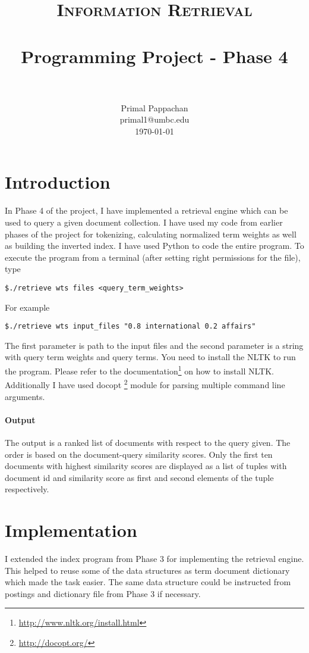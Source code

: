 \documentclass[paper=a4, fontsize=11pt]{scrartcl}
\title{
		\usefont{OT1}{bch}{b}{n}
		\normalfont \normalsize \textsc{Information Retrieval} \\ [25pt]
		\horrule{0.5pt} \\[0.4cm]
		\huge Programming Project - Phase 4 \\
		\horrule{2pt} \\[0.5cm]
}
\author{
		\normalfont 								\normalsize
        Primal Pappachan\\[-3pt]		\normalsize
        primal1@umbc.edu\\[-3pt]		\normalsize
        \today
}
\date{}
\numberwithin{equation}{section}		%
\numberwithin{figure}{section}			%
\numberwithin{table}{section}				%
\begin{document}
\maketitle
\section{Introduction}
In Phase 4 of the project, I have implemented a retrieval engine which can be used to query a given document collection. I have used my code from earlier phases of the project for tokenizing, calculating normalized term weights as well as building the inverted index. I have used Python to code the entire program. To execute the program from a terminal (after setting right permissions for the file), type 

\begin{verbatim}
$./retrieve wts files <query_term_weights> 
\end{verbatim}

For example
\begin{verbatim}
$./retrieve wts input_files "0.8 international 0.2 affairs"
\end{verbatim}

The first parameter is path to the input files and the second parameter is a string with query term weights and query terms. You need to install the NLTK to run the program. Please refer to the documentation\footnote{\url{http://www.nltk.org/install.html}} on how to install NLTK. Additionally I have used docopt \footnote{\url{http://docopt.org/}} module for parsing multiple command line arguments.

\paragraph{Output}

The output is a ranked list of documents with respect to the query given. The order is based on the document-query similarity scores. Only the first ten documents with highest similarity scores are displayed as a list of tuples with document id and similarity score as first and second elements of the tuple respectively.

\section{Implementation}

I extended the index program from Phase 3 for implementing the retrieval engine. This helped to reuse some of the data structures as term document dictionary which made the task easier. The same data structure could be instructed from postings and dictionary file from Phase 3 if necessary. 
\end{document}
